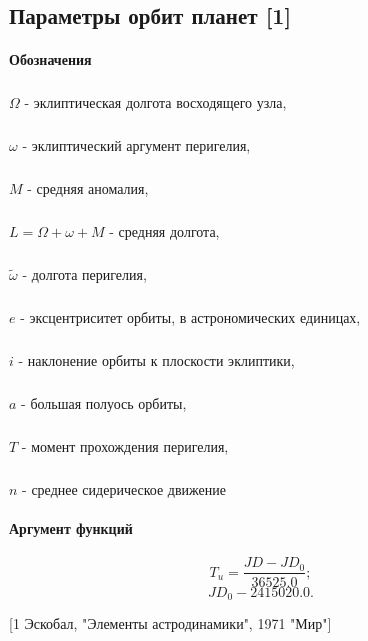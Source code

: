 \subsection{Параметры орбит планет [1]}
\paragraph{Обозначения}
\subparagraph{}$\Omega$ - эклиптическая долгота восходящего узла,
\subparagraph{}$\omega$ - эклиптический аргумент перигелия,
\subparagraph{}$M$ - средняя аномалия,
\subparagraph{}$L = \Omega + \omega + M$ - средняя долгота,
\subparagraph{}$\widetilde{\omega}$ - долгота перигелия,
\subparagraph{}$e$ - эксцентриситет орбиты, в астрономических единицах,
\subparagraph{}$i$ - наклонение орбиты к плоскости эклиптики,
\subparagraph{}$a$ - большая полуось орбиты,
\subparagraph{}$T$ - момент прохождения перигелия,
\subparagraph{}$n$ - среднее сидерическое движение

\paragraph{Аргумент функций}
$$T_u = \frac{{JD} - {JD}_0}{36525.0};$$
$${JD}_0 - 2415020.0.$$



[1 Эскобал, "Элементы астродинамики", 1971 "Мир"]

